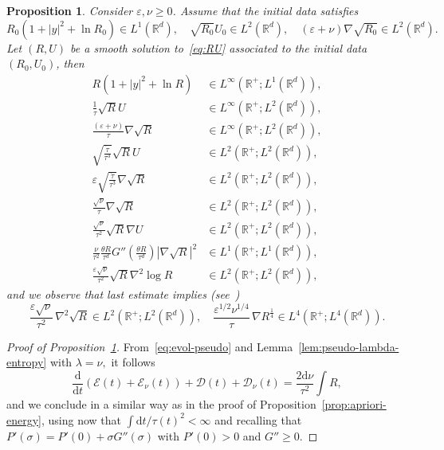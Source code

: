 \documentclass[11pt]{article}
\newtheorem{prop}[theo]{Proposition}
\theoremstyle{definition}
\numberwithin{equation}{section}
\numberwithin{figure}{section}
\numberwithin{table}{section}
\newcommand*\R{\mathbb{R}}
\newcommand*\dd {\mathrm{d}}
\newcommand*\<{\left\langle}
\renewcommand*\>{\right\rangle}
\renewcommand*\ge{\geqslant}
\newcommand*\eps{\varepsilon}
\begin{document}
\begin{prop}\label{prop:apriori-BDentropy}
Consider $\eps, \nu \ge 0$. Assume that the initial data satisfies
\[
R_0(1+|y|^2 + \ln R_0) \in L^1(\R^d), \quad
\sqrt{R_0} U_0 \in L^2(\R^d), \quad (\eps+\nu) \nabla \sqrt{R_0} \in L^2(\R^d).
\]
Let $(R,U)$ be a smooth solution to~\eqref{eq:RU} associated to the initial data $(R_0,U_0)$, then
\begin{equation}\label{eq:apriori-BDentropy}
\begin{aligned}
R(1+|y|^2 + \ln R) &\in L^\infty(\R^+ ; L^1(\R^d)), \\
\frac{1}{\tau} \sqrt{R} U &\in L^\infty(\R^+ ; L^2 (\R^d)), \\
\frac{(\eps+\nu)}{\tau} \nabla \sqrt{R} &\in L^\infty(\R^+ ; L^2 (\R^d)), \\
\sqrt{\frac{\dot \tau}{\tau^3}} \sqrt R U &\in L^2(\R^+ ; L^2 (\R^d)), \\
\eps \sqrt{\frac{\dot \tau}{\tau^3}} \nabla \sqrt{R} &\in L^2(\R^+ ; L^2 (\R^d)), \\
\frac{\sqrt \nu}{\tau} \nabla \sqrt{R} &\in L^2(\R^+ ; L^2 (\R^d)), \\
\frac{\sqrt \nu}{\tau^2} \sqrt{R} \nabla U &\in L^2(\R^+ ; L^2 (\R^d)), \\
\frac{ \nu}{\tau^2} \frac{\theta R}{\tau^d} G'' \left(\frac{\theta R}{\tau^d} \right) |\nabla \sqrt R|^2 &\in L^1(\R^+;L^1(\R^d)),\\
\frac{\eps \sqrt \nu }{\tau^2} \sqrt R \nabla^2 \log R &\in L^2(\R^+ ; L^2 (\R^d)),
\end{aligned}
\end{equation}
and we observe that last estimate implies (see~\cite{Jungel,VasseurYu})
\[
\frac{\eps \sqrt \nu }{\tau^2} \, \nabla^2 \sqrt R \in L^2(\R^+ ; L^2 (\R^d)),
\quad
\frac{\eps^{1/2} \nu^{1/4} }{\tau} \, \nabla R^{\frac14} \in L^4(\R^+ ; L^4 (\R^d)).
\]
\end{prop}

\begin{proof}[Proof of Proposition~\ref{prop:apriori-BDentropy}]
From~\eqref{eq:evol-pseudo} and Lemma~\ref{lem:pseudo-lambda-entropy} with $\lambda = \nu,$ it follows
\[
\frac{\dd }{\dd t} \left(\mathcal E(t) + \mathcal E_{\nu}(t) \right) + \mathcal D(t) + \mathcal D_{\nu}(t) = \frac{2 \dd\nu}{\tau^2} \int R,
\]
and we conclude in a similar way as in the proof of Proposition~\ref{prop:apriori-energy}, using now that $\int \dd t/\tau(t)^{2} < \infty$ and recalling that $P'(\sigma) = P'(0) + \sigma G''(\sigma)$ with $P'(0) >0$ and $G'' \ge 0$.
\end{proof}
\end{document}
